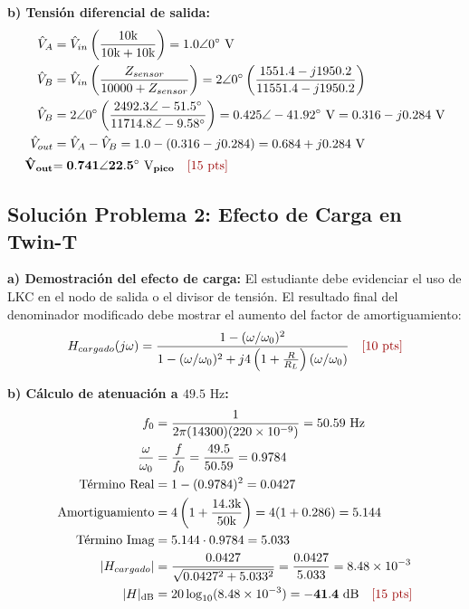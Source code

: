 \documentclass[11pt,a4paper,twoside]{article}
\begin{document}
\textbf{b) Tensión diferencial de salida:}
\begin{align*}
    \hat{V}_A &= \hat{V}_{in} \left(\frac{10\text{k}}{10\text{k} + 10\text{k}}\right) = 1.0\angle 0^\circ\text{ V} \\
    \hat{V}_B &= \hat{V}_{in} \left(\frac{Z_{sensor}}{10000 + Z_{sensor}}\right) = 2\angle 0^\circ \left(\frac{1551.4 - j1950.2}{11551.4 - j1950.2}\right) \\
    \hat{V}_B &= 2\angle 0^\circ \left(\frac{2492.3 \angle -51.5^\circ}{11714.8 \angle -9.58^\circ}\right) = 0.425\angle -41.92^\circ\text{ V} = 0.316 - j0.284\text{ V} \\
    \hat{V}_{out} &= \hat{V}_A - \hat{V}_B = 1.0 - (0.316 - j0.284) = 0.684 + j0.284\text{ V} \\
    \mathbf{\hat{V}_{out}} &\mathbf{= 0.741\angle 22.5^\circ\text{ V}_{pico}} \quad \text{\color{ucbred}[15 pts]}
\end{align*}

\subsection*{Solución Problema 2: Efecto de Carga en Twin-T}
\textbf{a) Demostración del efecto de carga:}
El estudiante debe evidenciar el uso de LKC en el nodo de salida o el divisor de tensión. El resultado final del denominador modificado debe mostrar el aumento del factor de amortiguamiento:
\begin{equation}
    H_{cargado}(j\omega) = \frac{1 - (\omega/\omega_0)^2}{1 - (\omega/\omega_0)^2 + j4\left(1 + \frac{R}{R_L}\right)(\omega/\omega_0)} \quad \text{\color{ucbred}[10 pts]}
\end{equation}

\textbf{b) Cálculo de atenuación a $49.5\text{ Hz}$:}
\begin{align*}
    f_0 &= \frac{1}{2\pi(14300)(220 \times 10^{-9})} = 50.59\text{ Hz} \\
    \frac{\omega}{\omega_0} &= \frac{f}{f_0} = \frac{49.5}{50.59} = 0.9784 \\
    \text{Término Real} &= 1 - (0.9784)^2 = 0.0427 \\
    \text{Amortiguamiento} &= 4\left(1 + \frac{14.3\text{k}}{50\text{k}}\right) = 4(1 + 0.286) = 5.144 \\
    \text{Término Imag} &= 5.144 \cdot 0.9784 = 5.033 \\
    \vert{}H_{cargado}\vert{} &= \frac{0.0427}{\sqrt{0.0427^2 + 5.033^2}} = \frac{0.0427}{5.033} = 8.48 \times 10^{-3} \\
    \vert{}H\vert{}_{\text{dB}} &= 20 \log_{10}(8.48 \times 10^{-3}) = \mathbf{-41.4\text{ dB}} \quad \text{\color{ucbred}[15 pts]}
\end{align*}
\end{document}
